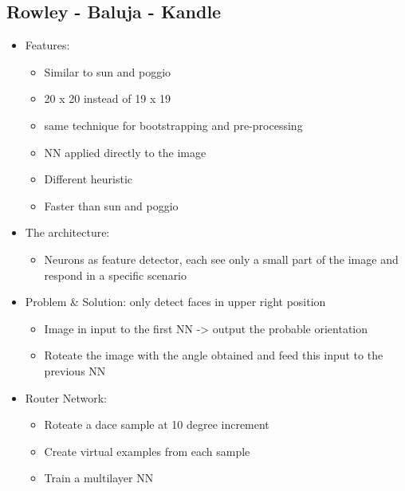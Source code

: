 \documentclass[12pt,oneside]{report}
\begin{document}
\subsection{Rowley - Baluja - Kandle}
\begin{itemize}
    \item Features:
    \begin{itemize}
        \item Similar to sun and poggio
        \item 20 x 20 instead of 19 x 19
        \item same technique for bootstrapping and pre-processing
        \item NN applied directly to the image
        \item Different heuristic
        \item Faster than sun and poggio
    \end{itemize}
    \item The architecture:
    \begin{itemize}
        \item Neurons as feature detector, each see only a small part of the image and respond in a specific scenario
    \end{itemize}
    \item Problem \& Solution: only detect faces in upper right position
    \begin{itemize}
        \item Image in input to the first NN -> output the probable orientation
        \item Roteate the image with the angle obtained and feed this input to the previous NN
    \end{itemize}
    \item Router Network:
    \begin{itemize}
        \item Roteate a dace sample at 10 degree increment
        \item Create virtual examples from each sample
        \item Train a multilayer NN 
    \end{itemize}
\end{itemize}
\end{document}
